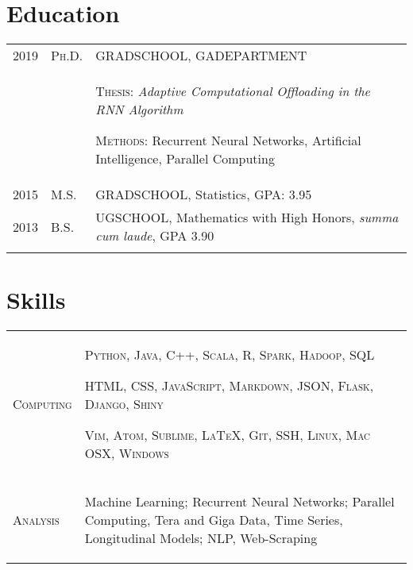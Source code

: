 \documentclass[a4paper,10pt]{article}
\begin{document}
\section{Education}
\begin{supertabular}{p{2cm} p{1.0cm} p{13.9cm}}
	\textsc{2019}		&		\textsc{Ph.D.} & \textsc{GRADSCHOOL}, GADEPARTMENT \\
					&&		 \begin{enumerate*}[label =$\diamond$, itemjoin={\newline}] 
							 \item \footnotesize \textsc{Thesis:} \emph{Adaptive Computational Offloading in the RNN Algorithm} 
							 \item \footnotesize  \textsc{Methods:} Recurrent Neural Networks, Artificial Intelligence, Parallel Computing
							 \end{enumerate*}  \\
	\textsc{2015} 	& 	\textsc{M.S.} & \textsc{GRADSCHOOL}, Statistics, \small GPA: 3.95  \\
	\textsc{2013} 	& 	\textsc{B.S.} & \textsc{UGSCHOOL}, Mathematics with High Honors, \small \emph{summa cum laude}, GPA 3.90 \\
	 \\
\end{supertabular}


\section{Skills}
\begin{supertabular}{p{3.4cm} p{13.9cm}}

	\textsc{Computing}			& \begin{enumerate*}[label =$\diamond$, itemjoin={\newline}]
																\item \small \textsc{Python, Java, C++, Scala, R, Spark, Hadoop, SQL}
																\item \small \textsc{HTML, CSS, JavaScript, Markdown, JSON, Flask, Django, Shiny}
																\item \small \textsc{Vim, Atom, Sublime, {\fb \LaTeX}, Git, SSH, Linux, Mac OSX, Windows }
																\end{enumerate*} \vspace{2mm} \\


	\textsc{Analysis}				& \begin{enumerate*}[label =$\diamond$, itemjoin={\newline}]
                                \item \small Machine Learning; Recurrent Neural Networks; Parallel Computing, Tera and Giga Data, Time Series, Longitudinal Models; NLP, Web-Scraping \end{enumerate*}  \vspace{1mm} \\



\end{supertabular}
\end{document}
